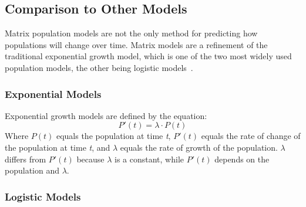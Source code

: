 \documentclass{article}
\begin{document}
    \subsection{Comparison to Other Models}\label{subsec:comparison-to-other-models}

    \hspace{\parindent}Matrix population models are not the only method for predicting how populations will change over time.
    Matrix models are a refinement of the traditional exponential growth model, which is one of the two most widely used population models, the other being logistic models~\cite{hendricks_55_2021}.

    \subsubsection{Exponential Models}

    \hspace{\parindent}Exponential growth models are defined by the equation:
    \begin{equation}
        P'(t)=\lambda \cdot P(t)\label{eq:equation6}
    \end{equation}
    \noindent Where $P(t)$ equals the population at time \textit{t}, $P'(t)$ equals the rate of change of the population at time \textit{t}, and $\lambda$ equals the rate of growth of the population.
    $\lambda$ differs from $P'(t)$ because $\lambda$ is a constant, while $P'(t)$ depends on the population and $\lambda$.

    \subsubsection{Logistic Models}
\end{document}
